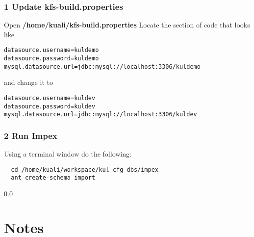 \subsubsection{1 Update kfs-build.properties}
Open \textbf{/home/kuali/kfs-build.properties} Locate the section of code that looks like
\begin{verbatim}
datasource.username=kuldemo
datasource.password=kuldemo
mysql.datasource.url=jdbc:mysql://localhost:3306/kuldemo
\end{verbatim}

and change it to

\begin{verbatim}
datasource.username=kuldev
datasource.password=kuldev
mysql.datasource.url=jdbc:mysql://localhost:3306/kuldev
\end{verbatim}

\subsubsection{2 Run Impex}
Using a terminal window do the following:
\begin{verbatim}
  cd /home/kuali/workspace/kul-cfg-dbs/impex
  ant create-schema import
\end{verbatim}

\newpage
{\setlength{\baselineskip}%
  {0.0\baselineskip}
  \section*{Notes}
  \hrulefill \par}